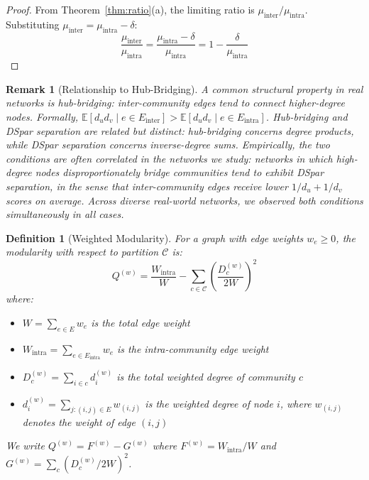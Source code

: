 \documentclass[10pt,journal,compsoc]{IEEEtran}
\newtheorem{definition}{Definition}
\newtheorem{remark}{Remark}
\begin{document}
\begin{proof}
From Theorem~\ref{thm:ratio}(a), the limiting ratio is $\mu_{\text{inter}}/\mu_{\text{intra}}$. Substituting $\mu_{\text{inter}} = \mu_{\text{intra}} - \delta$:
\begin{equation}
\frac{\mu_{\text{inter}}}{\mu_{\text{intra}}} = \frac{\mu_{\text{intra}} - \delta}{\mu_{\text{intra}}} = 1 - \frac{\delta}{\mu_{\text{intra}}}
\end{equation}
\end{proof}

\begin{remark}[Relationship to Hub-Bridging]
A common structural property in real networks is \emph{hub-bridging}: inter-community edges tend to connect higher-degree nodes. Formally,
$\mathbb{E}[d_u d_v \mid e \in E_{\text{inter}}] > \mathbb{E}[d_u d_v \mid e \in E_{\text{intra}}]$.
Hub-bridging and DSpar separation are related but distinct: hub-bridging concerns degree products, while DSpar separation concerns inverse-degree sums.
Empirically, the two conditions are often correlated in the networks we study: networks in which high-degree nodes disproportionately bridge communities tend to exhibit DSpar separation, in the sense that inter-community edges receive lower $1/d_u + 1/d_v$ scores on average.
Across diverse real-world networks, we observed both conditions simultaneously in all cases.
\end{remark}



\begin{definition}[Weighted Modularity]
For a graph with edge weights $w_e \geq 0$, the modularity with respect to partition $\mathcal{C}$ is:
\begin{equation}
Q^{(w)} = \frac{W_{\text{intra}}}{W} - \sum_{c \in \mathcal{C}} \left( \frac{D_c^{(w)}}{2W} \right)^2
\end{equation}
where:
\begin{itemize}
    \item $W = \sum_{e \in E} w_e$ is the total edge weight
    \item $W_{\text{intra}} = \sum_{e \in E_{\text{intra}}} w_e$ is the intra-community edge weight
    \item $D_c^{(w)} = \sum_{i \in c} d_i^{(w)}$ is the total weighted degree of community $c$
    \item $d_i^{(w)} = \sum_{j: (i,j) \in E} w_{(i,j)}$ is the weighted degree of node $i$, where $w_{(i,j)}$ denotes the weight of edge $(i,j)$
\end{itemize}
We write $Q^{(w)} = F^{(w)} - G^{(w)}$ where $F^{(w)} = W_{\text{intra}}/W$ and $G^{(w)} = \sum_c (D_c^{(w)}/2W)^2$.
\end{definition}
\end{document}
